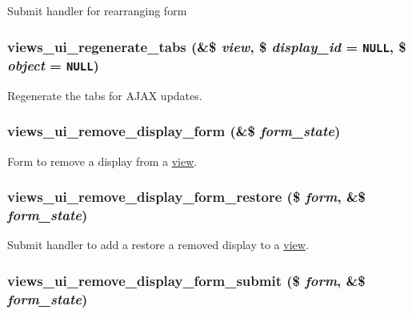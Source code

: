 Submit handler for rearranging form \hypertarget{admin_8inc_edcac3bc6fcf479946e4fcf5c8a5eb26}{
\subsubsection[{views\_\-ui\_\-regenerate\_\-tabs}]{\setlength{\rightskip}{0pt plus 5cm}views\_\-ui\_\-regenerate\_\-tabs (\&\$ {\em view}, \/  \$ {\em display\_\-id} = {\tt NULL}, \/  \$ {\em object} = {\tt NULL})}}
\label{admin_8inc_edcac3bc6fcf479946e4fcf5c8a5eb26}


Regenerate the tabs for AJAX updates. \hypertarget{admin_8inc_f4e3e3ea2e61d0352567b4fed8bda83f}{
\subsubsection[{views\_\-ui\_\-remove\_\-display\_\-form}]{\setlength{\rightskip}{0pt plus 5cm}views\_\-ui\_\-remove\_\-display\_\-form (\&\$ {\em form\_\-state})}}
\label{admin_8inc_f4e3e3ea2e61d0352567b4fed8bda83f}


Form to remove a display from a \hyperlink{classview}{view}. \hypertarget{admin_8inc_85640b9f63281c89ed546c623c22c776}{
\subsubsection[{views\_\-ui\_\-remove\_\-display\_\-form\_\-restore}]{\setlength{\rightskip}{0pt plus 5cm}views\_\-ui\_\-remove\_\-display\_\-form\_\-restore (\$ {\em form}, \/  \&\$ {\em form\_\-state})}}
\label{admin_8inc_85640b9f63281c89ed546c623c22c776}


Submit handler to add a restore a removed display to a \hyperlink{classview}{view}. \hypertarget{admin_8inc_7f6a9599a03beef16e3917fa0a1c275d}{
\subsubsection[{views\_\-ui\_\-remove\_\-display\_\-form\_\-submit}]{\setlength{\rightskip}{0pt plus 5cm}views\_\-ui\_\-remove\_\-display\_\-form\_\-submit (\$ {\em form}, \/  \&\$ {\em form\_\-state})}}
\label{admin_8inc_7f6a9599a03beef16e3917fa0a1c275d}



